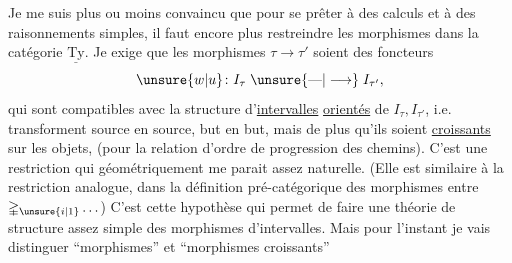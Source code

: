 Je me suis plus ou moins convaincu que pour se prêter à des calculs et à des raisonnements simples, il faut encore plus restreindre les morphismes dans la  catégorie $\underline{\mathrm{Ty}}$. Je  exige que les morphismes $\tau\to\tau'$ soient des foncteurs
\[
\unsure{w|u}\colon I_\tau\mathrel{\unsure{\text{---}|\longrightarrow}}I_{\tau'},
\]
qui sont compatibles avec la structure d'\uline{intervalles} \uline{orientés} de $I_\tau,I_{\tau'}$, i.e.  transforment source en source, but en but, mais de plus qu'ils soient \uline{croissants} sur les objets, (pour la relation d'ordre de progression des chemins).
C'est une restriction qui géométriquement me parait assez naturelle. (Elle est similaire à la restriction analogue, dans la définition pré-catégorique des morphismes entre $\mathbb{\Delta}_{\unsure{i|1}}\ldots$) C'est cette hypothèse qui permet de faire une théorie de structure assez simple des  morphismes d'intervalles. Mais pour l'instant je vais distinguer ``morphismes'' et ``morphismes croissants''
